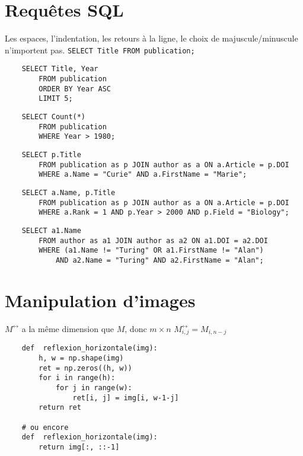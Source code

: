 
\section*{Requêtes SQL}
\ques Les espaces, l'indentation, les retours à la ligne, le choix de majuscule/minuscule n'importent pas.
\ssques \texttt{SELECT Title FROM publication;}
\ssques \begin{verbatim}
    SELECT Title, Year
        FROM publication
        ORDER BY Year ASC
        LIMIT 5;
\end{verbatim}
\ssques \begin{verbatim}
    SELECT Count(*)
        FROM publication
        WHERE Year > 1980;
\end{verbatim}

\ssques \begin{verbatim}
    SELECT p.Title
        FROM publication as p JOIN author as a ON a.Article = p.DOI
        WHERE a.Name = "Curie" AND a.FirstName = "Marie";
\end{verbatim}

\ssques \begin{verbatim}
    SELECT a.Name, p.Title
        FROM publication as p JOIN author as a ON a.Article = p.DOI
        WHERE a.Rank = 1 AND p.Year > 2000 AND p.Field = "Biology";
\end{verbatim}

\ssques \begin{verbatim}
    SELECT a1.Name
        FROM author as a1 JOIN author as a2 ON a1.DOI = a2.DOI
        WHERE (a1.Name != "Turing" OR a1.FirstName != "Alan")
            AND a2.Name = "Turing" AND a2.FirstName = "Alan";
\end{verbatim}

\section*{Manipulation d'images}

\ques
\ssques $ M^{\leftrightarrow} $ a la même dimension que $ M $, donc $ m \times n $
\ssques $ M^{\leftrightarrow}_{i,j} = M_{i, n-j} $
\ssques \begin{verbatim}
    def  reflexion_horizontale(img):
        h, w = np.shape(img)
        ret = np.zeros((h, w))
        for i in range(h):
            for j in range(w):
                ret[i, j] = img[i, w-1-j]
        return ret

    # ou encore
    def  reflexion_horizontale(img):
        return img[:, ::-1]
\end{verbatim}

